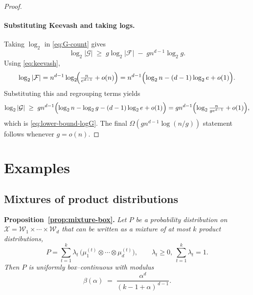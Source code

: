 \documentclass[arxiv]{colt2026}
\newenvironment{restatedproposition}[1]
  {\par\noindent\textbf{Proposition~\ref{#1}.}\itshape}
  {\par}
\newcommand{\X}{\mathcal{X}}
\newcommand{\F}{\mathcal{F}}
\newcommand{\G}{\mathcal{G}}
\newcommand{\W}{\mathcal{W}}
\begin{document}
\begin{proof}
\paragraph{Substituting Keevash and taking logs.}
Taking $\log_2$ in \eqref{eq:G-count} gives
\[
\log_2|\G|
\;\ge\;
g\log_2|\F| \;-\; g n^{d-1}\log_2 g.
\]
Using \eqref{eq:keevash},
\[
\log_2|\F|
=
n^{d-1}\log_2\!\Bigl(\tfrac{n}{e^{d-1}}+o(n)\Bigr)
=
n^{d-1}\Bigl(\log_2 n-(d-1)\log_2 e+o(1)\Bigr).
\]
Substituting this and regrouping terms yields
\[
\log_2|\G|
\;\ge\;
g n^{d-1}\Bigl(\log_2 n-\log_2 g-(d-1)\log_2 e+o(1)\Bigr)
=
g n^{d-1}\Bigl(\log_2\tfrac{n}{g e^{d-1}}+o(1)\Bigr),
\]
which is \eqref{eq:lower-bound-logG}.
The final $\Omega(g n^{d-1}\log(n/g))$ statement follows whenever $g=o(n)$.
\end{proof}

\section{Examples}
\subsection{Mixtures of product distributions}\label{sec:proof-mixture}

\begin{restatedproposition}{prop:mixture-box}
Let $P$ be a probability distribution on
\(
\X=\W_1\times\cdots\times\W_d
\)
that can be written as a mixture of at most $k$ product distributions,
\[
P=\sum_{t=1}^k \lambda_t\,
\bigl(\mu^{(t)}_1\otimes\cdots\otimes\mu^{(t)}_d\bigr),
\qquad
\lambda_t\ge 0,\ \sum_{t=1}^k\lambda_t=1.
\]
Then $P$ is uniformly box--continuous with modulus
\[
\beta(\alpha)
\;=\;
\frac{\alpha^d}{(k-1+\alpha)^{\,d-1}}.
\]
\end{restatedproposition}
\end{document}
